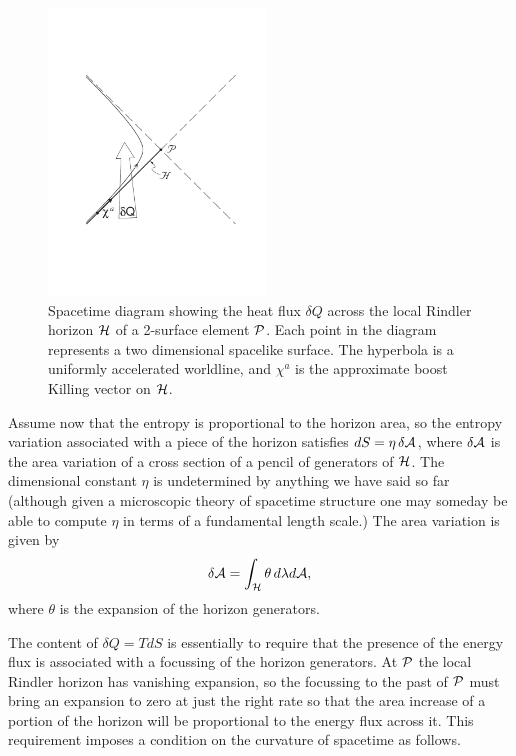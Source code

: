 \documentclass[12pt]{article}
\begin{document}
\begin{figure}[t]
\begin{center}
\includegraphics[height=3in]{tosfig.pdf}
\end{center}
\caption{Spacetime diagram showing the heat flux $\delta Q$
across the local Rindler horizon $\cal H$ of a 2-surface element
$\cal P$. Each point in the diagram represents a two dimensional
spacelike surface. The hyperbola is a uniformly accelerated worldline,
and $\chi^a$ is the approximate boost Killing vector on $\cal H$.}
\end{figure}


Assume now that the entropy is proportional to the horizon
area, so the entropy variation associated with a piece of the
horizon satisfies $dS=\eta\, \delta{\cal A}$, where $\delta{\cal A}$ is
the area variation of a cross section of a pencil of generators
of ${\cal H}$. The dimensional constant $\eta$ is
undetermined by anything we have said so far
(although given a microscopic theory of spacetime structure
one may someday be able to compute $\eta$ in terms of a
fundamental length scale.)
The area variation is given by
\begin{equation}
\delta{\cal A}=\int_{\cal H} \theta \, d\lambda d{\cal A},
\end{equation}
where $\theta$ is the expansion of the horizon generators.

The content of $\delta Q=T dS$ is essentially to require that
the presence of the energy flux is associated with a focussing
of the horizon generators. At ${\cal P}$ the local Rindler horizon
has vanishing expansion, so the focussing to the past of
${\cal P}$ must bring an expansion to zero at just the right rate so that
the area increase of a portion of the horizon will be
proportional to the energy flux across it.
This requirement imposes a condition on the curvature of
spacetime as follows.
\end{document}
